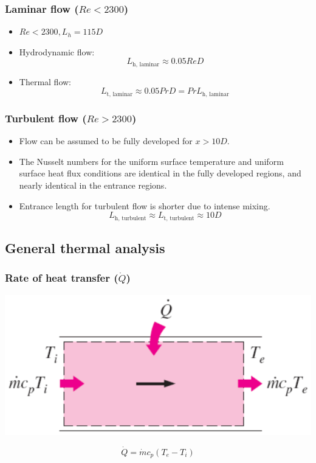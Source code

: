 \documentclass[11pt]{article}
\begin{document}
\subsubsection{Laminar flow (\(Re < 2300\))}
\label{sec:orgf05f140}
\begin{itemize}
\item \(Re < 2300, L_h = 115D\)
\item Hydrodynamic flow:
\[L_{\text{h, laminar}} \approx 0.05 Re D\]
\item Thermal flow:
\[L_{\text{t, laminar}} \approx 0.05 Pr D = Pr L_{\text{h, laminar}}\]
\end{itemize}

\subsubsection{Turbulent flow (\(Re > 2300\))}
\label{sec:org2332a81}
\begin{itemize}
\item Flow can be assumed to be fully developed for \(x > 10 D\).
\item The Nusselt numbers for the uniform surface temperature and uniform surface heat flux conditions are identical in the fully developed regions, and nearly identical in the entrance regions.
\item Entrance length for turbulent flow is shorter due to intense mixing.
\[L_{\text{h, turbulent}} \approx L_{\text{t, turbulent}} \approx 10 D\]
\end{itemize}

 \newpage

\subsection{General thermal analysis}
\label{sec:org1f8f139}

\subsubsection{Rate of heat transfer (\(\dot{Q}\))}
\label{sec:org4d62277}
\begin{center}
\includegraphics[width=.9\linewidth]{./images/general-thermal-analysis-heat-transfer-rate.png}
\end{center}
\[\dot{Q} = \dot{m} c_p (T_e - T_i)\]
\end{document}
